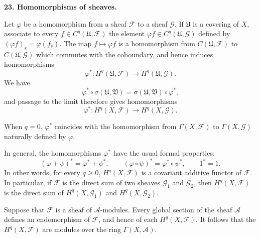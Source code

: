 
\medskip
{}\label{fac:I:3:no:23}
\textbf{23. Homomorphisms of sheaves.}

Let $\varphi$ be a homomorphism from a sheaf $\mathcal{F}$ to a sheaf $\mathcal{G}$. If $\mathfrak{U}$ is a covering of $X$, associate to every $f\in C^q(\mathfrak{U},\mathcal{F})$ the element $\varphi f\in C^q(\mathfrak{U},\mathcal{G})$ defined by $(\varphi f)_s=\varphi(f_s)$. The map $f\mapsto\varphi f$ is a homomorphism from $C(\mathfrak{U},\mathcal{F})$ to $C(\mathfrak{U},\mathcal{G})$ which commutes with the coboundary, and hence induces homomorphisms
\[
\varphi^*:H^q(\mathfrak{U},\mathcal{F})
\longrightarrow H^q(\mathfrak{U},\mathcal{G}).
\]
We have
\[
\varphi^*\circ\sigma(\mathfrak{U},\mathfrak{V})
=\sigma(\mathfrak{U},\mathfrak{V})\circ\varphi^*,
\]
and passage to the limit therefore gives homomorphisms
\[
\varphi^*:H^q(X,\mathcal{F})\longrightarrow H^q(X,\mathcal{G}).
\]

When $q=0$, $\varphi^*$ coincides with the homomorphism from $\Gamma(X,\mathcal{F})$ to $\Gamma(X,\mathcal{G})$ naturally defined by $\varphi$.

In general, the homomorphisms $\varphi^*$ have the usual formal properties:
\[
(\varphi+\psi)^*=\varphi^*+\psi^*,\qquad
(\varphi\circ\psi)^*=\varphi^*\circ\psi^*,\qquad
1^*=1.
\]
In other words, for every $q\geq0$, $H^q(X,\mathcal{F})$ is a covariant additive functor of $\mathcal{F}$. In particular, if $\mathcal{F}$ is the direct sum of two sheaves $\mathcal{G}_1$ and $\mathcal{G}_2$, then $H^q(X,\mathcal{F})$ is the direct sum of $H^q(X,\mathcal{G}_1)$ and $H^q(X,\mathcal{G}_2)$.

Suppose that $\mathcal{F}$ is a sheaf of $\mathcal{A}$-modules. Every global section of the sheaf $\mathcal{A}$ defines an endomorphism of $\mathcal{F}$, and hence of each $H^q(X,\mathcal{F})$. It follows that the $H^q(X,\mathcal{F})$ are modules over the ring $\Gamma(X,\mathcal{A})$.
